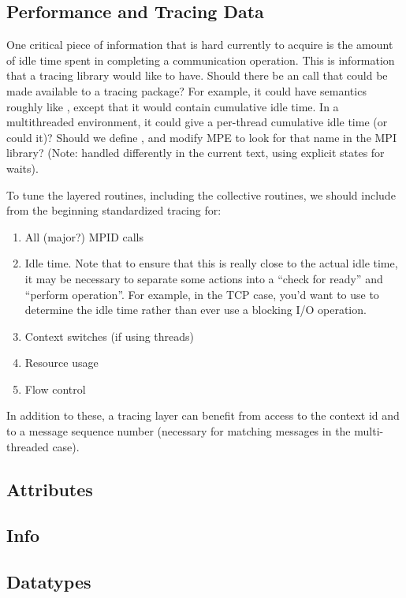 \documentclass{article}
\begin{document}
\subsection{Performance and Tracing Data}
\label{sec:tracing}

One critical piece of information that is hard currently to acquire is
the amount of idle time spent in completing a communication operation.
This is information that a tracing library would like to have.  Should
there be an  call that could be made available to a tracing
package?  For example, it could have semantics roughly like
, except that it would contain cumulative idle time.  In a
multithreaded environment, it could give a per-thread cumulative idle
time (or could it)?  Should we define , and modify MPE
to look for that name in the MPI library? (Note: handled differently in the
current text, using explicit states for waits).

To tune the layered routines, including the collective routines, we
should include from the beginning standardized tracing for:
\begin{enumerate}
\item All (major?) MPID calls
\item Idle time.  Note that to ensure that this is really close to the
actual idle time, it may be necessary to separate some actions into a
``check for ready'' and ``perform operation''.  For example, in the
TCP case, you'd want to use  to determine the idle time
rather than ever use a blocking I/O operation.  
\item Context switches (if using threads)
\item Resource usage
\item Flow control
\end{enumerate}
In addition to these, a tracing layer can benefit from access to the
context id and to a message sequence number (necessary for matching
messages in the multi-threaded case).  


\subsection{Attributes} 
\subsection{Info}
\subsection{Datatypes}
\end{document}
